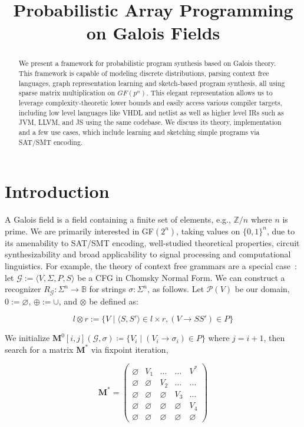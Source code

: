 \documentclass[sigplan,10pt,review,anonymous]{acmart}
\begin{document}
\title{Probabilistic Array Programming on Galois Fields}
\begin{abstract}
We present a framework for probabilistic program synthesis based on Galois theory. This framework is capable of modeling discrete distributions, parsing context free languages, graph representation learning and sketch-based program synthesis, all using sparse matrix multiplication on $GF(p^n)$. This elegant representation allows us to leverage complexity-theoretic lower bounds and easily access various compiler targets, including low level languages like VHDL and netlist as well as higher level IRs such as JVM, LLVM, and JS using the same codebase. We discuss its theory, implementation and a few use cases, which include learning and sketching simple programs via SAT/SMT encoding.
\end{abstract}
\maketitle

\section{Introduction}

A Galois field is a field containing a finite set of elements, e.g., $\mathbb{Z}/n$ where $n$ is prime. We are primarily interested in GF$(2^n)$, taking values on $\{0, 1\}^n$, due to its amenability to SAT/SMT encoding, well-studied theoretical properties, circuit synthesizability and broad applicability to signal processing and computational linguistics. For example, the theory of context free grammars are a special case~\citep{jansson2016certified, bakinova2020formal}: let $\mathcal{G} := \langle V, \Sigma, P, S\rangle$ be a CFG in Chomsky Normal Form. We can construct a recognizer $R_\mathcal{G}: \Sigma^n \rightarrow \mathbb{B}$ for strings $\sigma: \Sigma^n$, as follows. Let $\mathcal P(V)$ be our domain, $0 := \varnothing$, $\oplus := \cup$, and $\otimes$ be defined as:

\vspace{-7pt}
\[
l \otimes r := \{V \mid \langle S, S'\rangle \in l \times r, (V\rightarrow SS') \in P\}
\]

We initialize $\mathbf{M}^0[i, j](\mathcal{G}, \sigma) \coloneqq \{V_i \mid (V_i \rightarrow \sigma_i) \in P\}$ where $j = i+1$, then search for a matrix $\mathbf{M}^*$ via fixpoint iteration,

\[
\mathbf{M}^* = \begin{pmatrix}
            \varnothing & V_1 & \ldots & \ldots & V^* \\
            \varnothing & \varnothing & V_2 & \ldots & \ldots \\
            \varnothing & \varnothing & \varnothing & V_3 & \ldots \\
            \varnothing & \varnothing & \varnothing & \varnothing & V_4 \\
            \varnothing & \varnothing & \varnothing & \varnothing & \varnothing
\end{pmatrix}
\]
\end{document}
